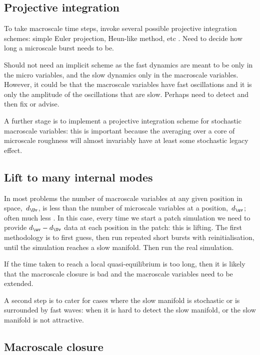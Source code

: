 \subsection{Projective integration}

To take macroscale time steps, invoke several possible projective integration schemes: simple Euler projection, Heun-like method, etc
\citep{Samaey08}.
Need to decide how long a microscale burst needs to be.

Should not need an implicit scheme as the fast dynamics are meant to be only in the micro variables, and the slow dynamics only in the macroscale variables.
However, it could be that the macroscale variables have fast oscillations and it is only the amplitude of the oscillations that are slow.  
Perhaps need to detect and then fix or advise.

A further stage is to implement a projective integration scheme for stochastic macroscale variables: this is important because the averaging over a core of microscale roughness will almost invariably have at least some stochastic legacy effect.




\subsection{Lift to many internal modes}

In most problems the number of macroscale variables at any given position in space,~\(d_{\Uv}\), is less than the number of microscale variables at a position,~\(d_{\uv}\); often much less \citep[e.g.]{Kevrekidis09a}.
In this case, every time we start a patch simulation we need to provide  \(d_{\uv}-d_{\Uv}\) data at each position in the patch: this is lifting.
The first methodology is to first guess, then run repeated short bursts with reinitialisation, until the simulation reaches a slow manifold.
Then run the real simulation.

If the time taken to reach a local quasi-equilibrium is too long, then it is likely that the macroscale closure is bad and the macroscale variables need to be extended.

A second step is to cater for cases where the slow manifold is stochastic or is surrounded by fast waves: when it is hard to detect the slow manifold, or the slow manifold is not attractive.





\subsection{Macroscale closure}

